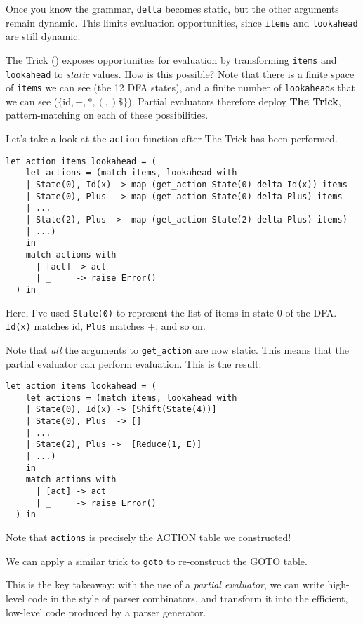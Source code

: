 Once you know the grammar, \texttt{delta} becomes static, but the other arguments remain dynamic. This limits evaluation opportunities, since \texttt{items} and \texttt{lookahead} are still dynamic. 

The Trick () exposes opportunities for evaluation by transforming \texttt{items} and \texttt{lookahead} to \textit{static} values. How is this possible? Note that there is a finite space of \texttt{items} we can see (the 12 DFA states), and a finite number of \texttt{lookahead}s that we can see ($\{\text{id}, +, *, (, ) \$ \}$). Partial evaluators therefore deploy \textbf{The Trick}, pattern-matching on each of these possibilities.

Let's take a look at the \texttt{action} function after The Trick has been performed.
\begin{verbatim}
let action items lookahead = (
    let actions = (match items, lookahead with
    | State(0), Id(x) -> map (get_action State(0) delta Id(x)) items
    | State(0), Plus  -> map (get_action State(0) delta Plus) items
    | ...
    | State(2), Plus ->  map (get_action State(2) delta Plus) items) 
    | ...) 
    in
    match actions with
      | [act] -> act
      | _     -> raise Error()
  ) in
\end{verbatim}
Here, I've used \texttt{State(0)} to represent the list of items in state 0 of the DFA. \texttt{Id(x)} matches id, \texttt{Plus} matches $+$, and so on.

Note that \textit{all} the arguments to \texttt{get\_action} are now static. This means that the partial evaluator can perform evaluation. This is the result:
\begin{verbatim}  
let action items lookahead = (
    let actions = (match items, lookahead with
    | State(0), Id(x) -> [Shift(State(4))]
    | State(0), Plus  -> []
    | ...
    | State(2), Plus ->  [Reduce(1, E)]
    | ...) 
    in
    match actions with
      | [act] -> act
      | _     -> raise Error()
  ) in
\end{verbatim}
Note that \texttt{actions} is precisely the ACTION table we constructed! 

We can apply a similar trick to \texttt{goto} to re-construct the GOTO table.

This is the key takeaway: with the use of a \textit{partial evaluator}, we can write high-level code in the style of parser combinators, and transform it into the efficient, low-level code produced by a parser generator.

